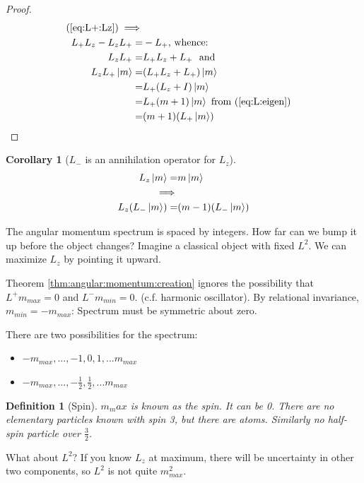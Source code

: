\documentclass[]{article}
\newtheorem{defn}[thm]{Definition}
\newtheorem{cor}[thm]{Corollary}
\begin{document}
\begin{proof}
	\begin{align*}
		(\ref{eq:L+:Lz})\implies\\
		L_+L_z-L_zL_+ =& -L_+ \text{, whence:}\\
		L_zL_+ =& L_+L_z + L_+\ \text{ and}\\
		L_z L_+ \ket{m} =& (L_+L_z + L_+)\ket{m}\\
		=& L_+ (L_z + I)\ket{m}\\
		=& L_+ (m + 1) \ket{m} \text{ from (\ref{eq:L:eigen})}\\
		=&  (m + 1) (L_+ \ket{m})
	\end{align*}
\end{proof}

\begin{cor}[$L_-$ is an annihilation  operator for $L_z$]
	\begin{align*}
	L_z \ket{m} =& m \ket{m} \\
	\implies&\\
	L_z (L_- \ket{m}) =& (m-1) (L_- \ket{m})
	\end{align*}	
\end{cor}

The angular momentum spectrum is spaced by integers. How far can we bump it up before the object changes? Imagine a classical object with fixed $L^2$. We can maximize $L_z$  by pointing it upward.

Theorem \ref{thm:angular:momentum:creation} ignores the possibility that $L^+m_{max}=0$ and $L^-m_{min}=0$. (c.f. harmonic oscillator). By relational invariance, $m_{min}=-m_{max}$: Spectrum must be symmetric about zero.

There are two possibilities for the spectrum:
\begin{itemize}
	\item $-m_{max},...,-1,0,1,...m_{max}$
	\item $-m_{max},...,-\frac{1}{2},\frac{1}{2},...m_{max}$
\end{itemize}

\begin{defn}[Spin]
	$m_max$ is known as the spin. It can be 0. There are no elementary particles known with spin 3, but there are atoms. Similarly no half-spin particle over $\frac{3}{2}$.
\end{defn}

What about $L^2$? If you know $L_z$ at maximum, there will be uncertainty in other two components, so $L^2$ is not quite $m_{max}^2$.
\end{document}
